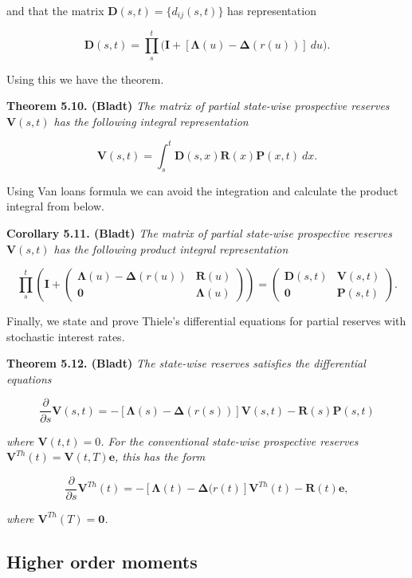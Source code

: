 \documentclass[a4paper,10pt,openany]{book}
\begin{document}
and that the matrix \(\mathbf D(s,t)=\{d_{ij}(s,t)\}\) has representation

\[
\mathbf D(s,t)=\prod_s^t\Big(\mathbf I+[\mathbf \Lambda(u)-\mathbf\Delta (r(u))]\ du\Big).
\]

Using this we have the theorem.

\textbf{Theorem 5.10. (Bladt)} \emph{The matrix of partial state-wise prospective reserves \(\mathbf V(s,t)\) has the following integral representation}

\[
\mathbf V(s,t)=\int_s^t\mathbf D(s,x)\mathbf R(x)\mathbf P(x,t)\ dx.
\]

Using Van loans formula we can avoid the integration and calculate the product integral from below.

\textbf{Corollary 5.11. (Bladt)} \emph{The matrix of partial state-wise prospective reserves \(\mathbf V(s,t)\) has the following product integral representation}

\[
\prod_s^t\left(\mathbf I+
\begin{pmatrix}
\mathbf \Lambda(u)-\mathbf \Delta (r(u)) & \mathbf R(u)\\
\mathbf 0 & \mathbf \Lambda(u)
\end{pmatrix}
\right)=\begin{pmatrix}
\mathbf D(s,t) & \mathbf V(s,t)\\
\mathbf 0 & \mathbf P(s,t)
\end{pmatrix}.
\]

Finally, we state and prove Thiele's differential equations for partial reserves with stochastic interest rates.

\textbf{Theorem 5.12. (Bladt)} \emph{The state-wise reserves satisfies the differential equations}

\[
\frac{\partial}{\partial s}\mathbf V(s,t)=-[\mathbf \Lambda(s) - \mathbf\Delta(r(s))]\mathbf V(s,t) - \mathbf R(s)\mathbf P(s,t)
\]

\emph{where \(\mathbf V(t,t)=0\). For the conventional state-wise prospective reserves \(\mathbf V^{Th}(t)=\mathbf V(t,T)\mathbf e\), this has the form}

\[
\frac{\partial}{\partial s}\mathbf V^{Th}(t)=-[\mathbf \Lambda(t) - \mathbf\Delta(r(t)]\mathbf V^{Th}(t) - \mathbf R(t)\mathbf e,
\]

\emph{where \(\mathbf V^{Th}(T)=\mathbf 0\).}

\hypertarget{higher-order-moments}{%
\subsection{Higher order moments}\label{higher-order-moments}}
\end{document}
